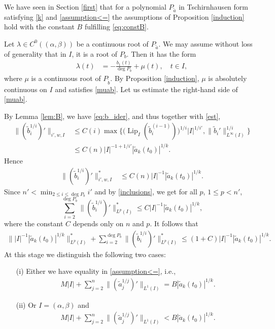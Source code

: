 \documentclass[12pt]{amsart}
\theoremstyle{plain}
\theoremstyle{definition}
\numberwithin{equation}{section}
\let\on=\operatorname
\begin{document}
We have seen in Section \ref{first} that for a polynomial $P_{\tilde a}$ in Tschirnhausen form satisfying \eqref{k} and \eqref{assumption<=}
the assumptions of Proposition \ref{induction} hold with the constant $B$ 
fulfilling \eqref{eq:constB}. 

Let ${\lambda} \in C^0(({\alpha},{\beta}))$ be a continuous root of $P_{\tilde a}$. We may assume without loss of generality that in $I$,  
it is a root of $P_b$.
Then it has the form 
\begin{align} \label{lambda}
  {\lambda}(t) &= - \frac{b_1(t)}{\deg P_b} + \mu(t), \quad t \in I, 
\end{align}
where $\mu$ is a continuous root of $P_{\tilde b}$. 
By Proposition \ref{induction}, $\mu$ is absolutely continuous on $I$ and satisfies \eqref{muab}.
Let us estimate the right-hand side of \eqref{muab}.

By Lemma \ref{lem:B}, we have \eqref{eq:b_ider}, and thus together with \eqref{est},
\begin{align*} 
\|(\tilde b_i^{1/i})'\|_{i',w,I} &\le C(i) \max\Big\{\big(\on{Lip}_{I}(\tilde b_i^{(i-1)})\big)^{1/i}|I|^{1/i'}, 
    \|\tilde b_i'\|_{L^\infty(I)}^{1/i}\Big\} \\
    &\le C(n)  |I|^{-1 +1/i'} |\tilde a_k (t_0)|^{1/k}.
\end{align*} 
Hence
\begin{align*} 
\|(\tilde b_i^{1/i})'\|^*_{i',w,I} &\le C(n)  |I|^{-1} |\tilde a_k (t_0)|^{1/k}.
\end{align*}
Since $n' < \min_{2 \le i \le \deg P_b} i'$ and by \eqref{inclusions}, we get for all $p$, $1 \le p < n'$, 
\begin{equation*}
  \sum_{i=2}^{\deg P_b} \|(\tilde b_i^{1/i})'\|^*_{L^p(I)} \le C  |I|^{-1} |\tilde a_k (t_0)|^{1/k}, 
\end{equation*}
where the constant $C$ depends only on $n$ and $p$.
It follows that  
\begin{align} \label{beforecases}
  \||I|^{-1} |\tilde a_k (t_0)|^{1/k} \|^*_{L^p (I)} + \sum_{i=2}^{\deg P_b} \|(\tilde b_i^{1/i})'\|^*_{L^p(I)} 
  \le (1+C) |I|^{-1} |\tilde a_k (t_0)|^{1/k}.
\end{align}
At this stage we distinguish the following two cases:
\begin{enumerate}
	\item[(i)] Either we have equality in \eqref{assumption<=}, i.e., 
	\begin{align}\label{assumption=}
		{M} |I| + \sum_{j=2}^n \|(\tilde a_j^{1/j})'\|_{L^1 (I)} =  B |\tilde a_k(t_0)|^{1/k} .
	\end{align}
	\item[(ii)] Or $I = ({\alpha},{\beta})$ and 
	\begin{align}\label{assumption<}
		{M} |I| + \sum_{j=2}^n \|(\tilde a_j^{1/j})'\|_{L^1 (I)} <  B |\tilde a_k(t_0)|^{1/k} .
	\end{align}
\end{enumerate}
\end{document}
